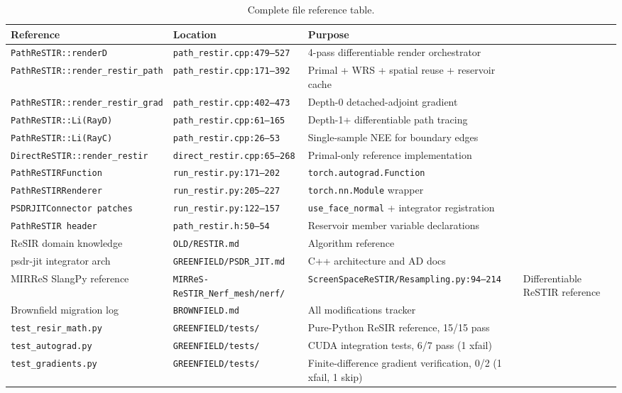 \begin{table}[ht]
\centering
\caption{Complete file reference table.}
\label{tab:references}
\footnotesize
\begin{tabular}{@{}lll@{}}
\toprule
\textbf{Reference} & \textbf{Location} & \textbf{Purpose} \\
\midrule
\texttt{PathReSTIR::renderD} & \texttt{path\_restir.cpp:479--527} & 4-pass differentiable render orchestrator \\
\texttt{PathReSTIR::render\_restir\_path} & \texttt{path\_restir.cpp:171--392} & Primal + WRS + spatial reuse + reservoir cache \\
\texttt{PathReSTIR::render\_restir\_grad} & \texttt{path\_restir.cpp:402--473} & Depth-0 detached-adjoint gradient \\
\texttt{PathReSTIR::Li(RayD)} & \texttt{path\_restir.cpp:61--165} & Depth-1+ differentiable path tracing \\
\texttt{PathReSTIR::Li(RayC)} & \texttt{path\_restir.cpp:26--53} & Single-sample NEE for boundary edges \\
\texttt{DirectReSTIR::render\_restir} & \texttt{direct\_restir.cpp:65--268} & Primal-only reference implementation \\
\texttt{PathReSTIRFunction} & \texttt{run\_restir.py:171--202} & \texttt{torch.autograd.Function} \\
\texttt{PathReSTIRRenderer} & \texttt{run\_restir.py:205--227} & \texttt{torch.nn.Module} wrapper \\
\texttt{PSDRJITConnector patches} & \texttt{run\_restir.py:122--157} & \texttt{use\_face\_normal} + integrator registration \\
\texttt{PathReSTIR header} & \texttt{path\_restir.h:50--54} & Reservoir member variable declarations \\
ReSIR domain knowledge & \texttt{OLD/RESTIR.md} & Algorithm reference \\
psdr-jit integrator arch & \texttt{GREENFIELD/PSDR\_JIT.md} & C++ architecture and AD docs \\
MIRReS SlangPy reference & \texttt{MIRReS-ReSTIR\_Nerf\_mesh/nerf/}&\newline
    \texttt{ScreenSpaceReSTIR/Resampling.py:94--214} & Differentiable ReSTIR reference \\
Brownfield migration log & \texttt{BROWNFIELD.md} & All modifications tracker \\
\texttt{test\_resir\_math.py} & \texttt{GREENFIELD/tests/} & Pure-Python ReSIR reference, 15/15 pass \\
\texttt{test\_autograd.py} & \texttt{GREENFIELD/tests/} & CUDA integration tests, 6/7 pass (1 xfail) \\
\texttt{test\_gradients.py} & \texttt{GREENFIELD/tests/} & Finite-difference gradient verification, 0/2 (1 xfail, 1 skip) \\
\bottomrule
\end{tabular}
\end{table}

